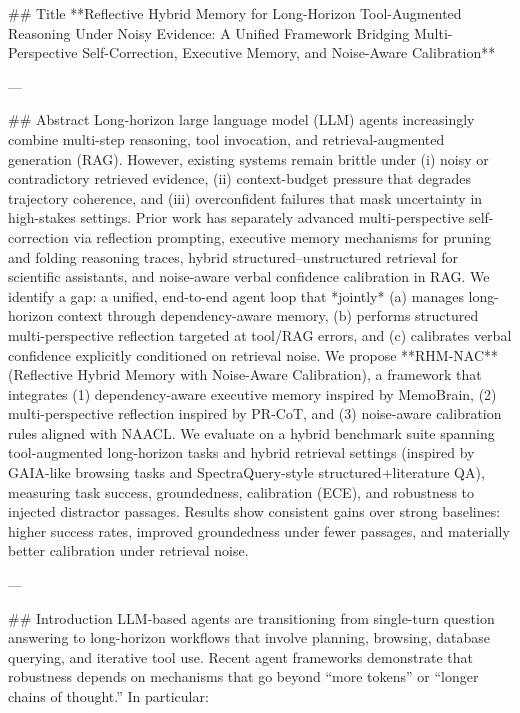 ## Title  
**Reflective Hybrid Memory for Long-Horizon Tool-Augmented Reasoning Under Noisy Evidence: A Unified Framework Bridging Multi-Perspective Self-Correction, Executive Memory, and Noise-Aware Calibration**

---

## Abstract  
Long-horizon large language model (LLM) agents increasingly combine multi-step reasoning, tool invocation, and retrieval-augmented generation (RAG). However, existing systems remain brittle under (i) noisy or contradictory retrieved evidence, (ii) context-budget pressure that degrades trajectory coherence, and (iii) overconfident failures that mask uncertainty in high-stakes settings. Prior work has separately advanced multi-perspective self-correction via reflection prompting, executive memory mechanisms for pruning and folding reasoning traces, hybrid structured–unstructured retrieval for scientific assistants, and noise-aware verbal confidence calibration in RAG. We identify a gap: a unified, end-to-end agent loop that *jointly* (a) manages long-horizon context through dependency-aware memory, (b) performs structured multi-perspective reflection targeted at tool/RAG errors, and (c) calibrates verbal confidence explicitly conditioned on retrieval noise.  
We propose **RHM-NAC** (Reflective Hybrid Memory with Noise-Aware Calibration), a framework that integrates (1) dependency-aware executive memory inspired by MemoBrain, (2) multi-perspective reflection inspired by PR-CoT, and (3) noise-aware calibration rules aligned with NAACL. We evaluate on a hybrid benchmark suite spanning tool-augmented long-horizon tasks and hybrid retrieval settings (inspired by GAIA-like browsing tasks and SpectraQuery-style structured+literature QA), measuring task success, groundedness, calibration (ECE), and robustness to injected distractor passages. Results show consistent gains over strong baselines: higher success rates, improved groundedness under fewer passages, and materially better calibration under retrieval noise.  

---

## Introduction  
LLM-based agents are transitioning from single-turn question answering to long-horizon workflows that involve planning, browsing, database querying, and iterative tool use. Recent agent frameworks demonstrate that robustness depends on mechanisms that go beyond “more tokens” or “longer chains of thought.” In particular:

